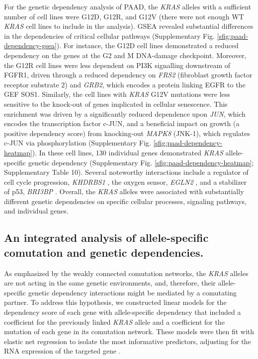 \documentclass[english, 10pt, letterpaper]{article}
\newcommand{\KRAS}{\emph{KRAS}}
\begin{document}
For the genetic dependency analysis of PAAD, the \KRAS{} alleles with a sufficient number of cell lines were G12D, G12R, and G12V (there were not enough WT \KRAS{} cell lines to include in the analysis).
GSEA revealed substantial differences in the dependencies of critical cellular pathways (Supplementary Fig. \ref{sfig:paad-dependency-gsea}).
For instance, the G12D cell lines demonstrated a reduced dependency on the genes at the G2 and M DNA-damage checkpoint.
Moreover, the G12R cell lines were less dependent on PI3K signalling downstream of FGFR1, driven through a reduced dependency on \emph{FRS2} (fibroblast growth factor receptor substrate 2) and \emph{GRB2}, which encodes a protein linking EGFR to the GEF SOS1.
Similarly, the cell lines with \KRAS{} G12V mutations were less sensitive to the knock-out of genes implicated in cellular senescence.
This enrichment was driven by a significantly reduced dependence upon \emph{JUN}, which encodes the transcription factor c-JUN, and a beneficial impact on growth (a positive dependency score) from knocking-out \emph{MAPK8} (JNK-1), which regulates c-JUN via phosphorylation (Supplementary Fig. \ref{sfig:paad-dependency-heatmap}).
In these cell lines, 130 individual genes demonstrated \KRAS{} allele-specific genetic dependency (Supplementary Fig. \ref{sfig:paad-dependency-heatmap}; Supplementary Table 10).
Several noteworthy interactions include a regulator of cell cycle progression, \emph{KHDRBS1} \cite{Barlat1997ADomain}, the oxygen sensor, \emph{EGLN2} \cite{Ivan2017TheFeedbacks}, and a stabilizer of p53, \emph{BRI3BP} \cite{Ha2008HCCRBP-1Stabilization}.
Overall, the \KRAS{} alleles were associated with substantially different genetic dependencies on specific cellular processes, signaling pathways, and individual genes.


\subsection*{An integrated analysis of allele-specific comutation and genetic dependencies.}

As emphasized by the weakly connected comutation networks, the \KRAS{} alleles are not acting in the same genetic environments, and, therefore, their allele-specific genetic dependency interactions might be mediated by a comutating partner.
To address this hypothesis, we constructed linear models for the dependency score of each gene with allele-specific dependency that included a coefficient for the previously linked \KRAS{} allele and a coefficient for the mutation of each gene in its comutation network.
These models were then fit with elastic net regression to isolate the most informative predictors, adjusting for the RNA expression of the targeted gene \cite{Zou2005RegularizationNet}.
\end{document}
